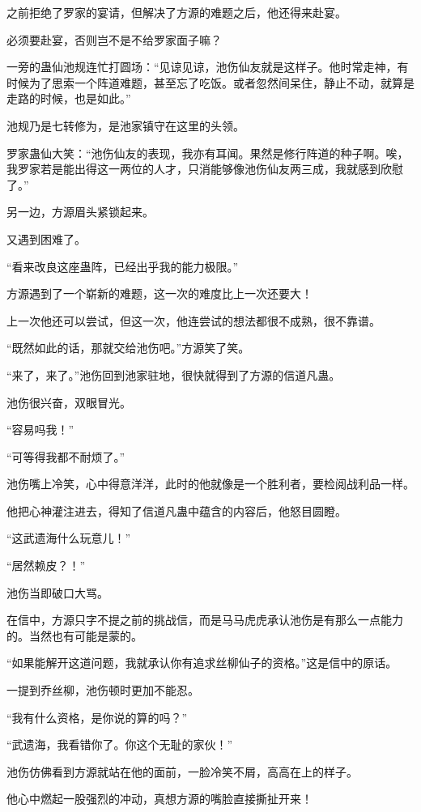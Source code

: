 \begin{this_body}
之前拒绝了罗家的宴请，但解决了方源的难题之后，他还得来赴宴。

必须要赴宴，否则岂不是不给罗家面子嘛？

一旁的蛊仙池规连忙打圆场：“见谅见谅，池伤仙友就是这样子。他时常走神，有时候为了思索一个阵道难题，甚至忘了吃饭。或者忽然间呆住，静止不动，就算是走路的时候，也是如此。”

池规乃是七转修为，是池家镇守在这里的头领。

罗家蛊仙大笑：“池伤仙友的表现，我亦有耳闻。果然是修行阵道的种子啊。唉，我罗家若是能出得这一两位的人才，只消能够像池伤仙友两三成，我就感到欣慰了。”

另一边，方源眉头紧锁起来。

又遇到困难了。

“看来改良这座蛊阵，已经出乎我的能力极限。”

方源遇到了一个崭新的难题，这一次的难度比上一次还要大！

上一次他还可以尝试，但这一次，他连尝试的想法都很不成熟，很不靠谱。

“既然如此的话，那就交给池伤吧。”方源笑了笑。

“来了，来了。”池伤回到池家驻地，很快就得到了方源的信道凡蛊。

池伤很兴奋，双眼冒光。

“容易吗我！”

“可等得我都不耐烦了。”

池伤嘴上冷笑，心中得意洋洋，此时的他就像是一个胜利者，要检阅战利品一样。

他把心神灌注进去，得知了信道凡蛊中蕴含的内容后，他怒目圆瞪。

“这武遗海什么玩意儿！”

“居然赖皮？！”

池伤当即破口大骂。

在信中，方源只字不提之前的挑战信，而是马马虎虎承认池伤是有那么一点能力的。当然也有可能是蒙的。

“如果能解开这道问题，我就承认你有追求丝柳仙子的资格。”这是信中的原话。

一提到乔丝柳，池伤顿时更加不能忍。

“我有什么资格，是你说的算的吗？”

“武遗海，我看错你了。你这个无耻的家伙！”

池伤仿佛看到方源就站在他的面前，一脸冷笑不屑，高高在上的样子。

他心中燃起一股强烈的冲动，真想方源的嘴脸直接撕扯开来！


\end{this_body}
